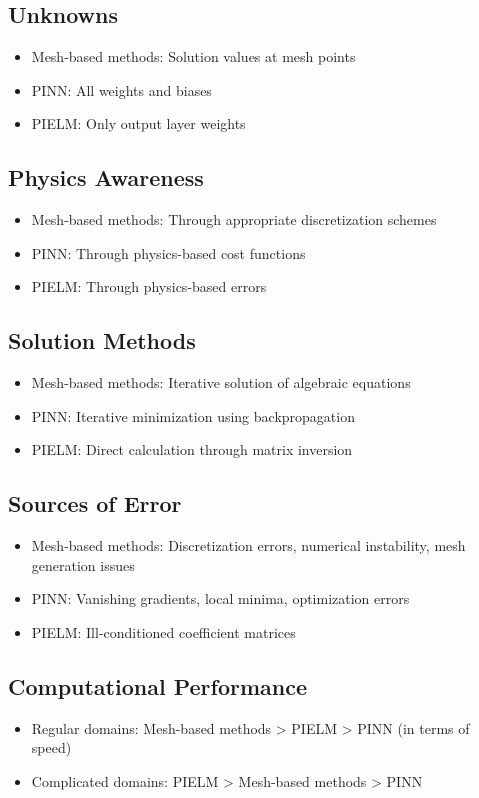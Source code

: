 \documentclass[11pt]{article}
\begin{document}
\subsection{Unknowns}
\begin{itemize}
    \item Mesh-based methods: Solution values at mesh points
    \item PINN: All weights and biases
    \item PIELM: Only output layer weights
\end{itemize}

\subsection{Physics Awareness}
\begin{itemize}
    \item Mesh-based methods: Through appropriate discretization schemes
    \item PINN: Through physics-based cost functions
    \item PIELM: Through physics-based errors
\end{itemize}

\subsection{Solution Methods}
\begin{itemize}
    \item Mesh-based methods: Iterative solution of algebraic equations
    \item PINN: Iterative minimization using backpropagation
    \item PIELM: Direct calculation through matrix inversion
\end{itemize}

\subsection{Sources of Error}
\begin{itemize}
    \item Mesh-based methods: Discretization errors, numerical instability, mesh generation issues
    \item PINN: Vanishing gradients, local minima, optimization errors
    \item PIELM: Ill-conditioned coefficient matrices
\end{itemize}

\subsection{Computational Performance}
\begin{itemize}
    \item Regular domains: Mesh-based methods > PIELM > PINN (in terms of speed)
    \item Complicated domains: PIELM > Mesh-based methods > PINN
\end{itemize}
\end{document}

